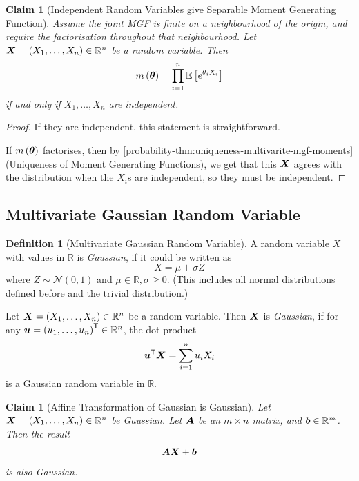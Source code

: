 \documentclass[11pt]{article}
\numberwithin{equation}{section}
\newtheorem{claim}[theorem]{Claim}
\theoremstyle{definition}
\newtheorem{definition}[theorem]{Definition}
\theoremstyle{remark}
\newcommand{\pqty}[1]{\left(#1\right)}
\newcommand{\bqty}[1]{\left[#1\right]}
\newcommand{\RR}{\mathbb R}
\newcommand{\transpose}{^{\mathsf T}}
\newcommand{\Expt}{\mathbb E}
\newcommand{\Normal}{\mathcal N}
\begin{document}
\begin{claim}[Independent Random Variables give Separable Moment Generating Function]\label{probability-claim-006}
    \label{probability-claim:independent-rv-separable-mgf}%
Assume the joint MGF is finite on a neighbourhood of the origin, and require the factorisation throughout that neighbourhood.
    Let \(\vb{X} = \pqty{X_1, \ldots, X_n} \in \RR^n\) be a random variable. Then
    \[
        m\pqty{\vb*{\theta}} = \prod_{i = 1}^{n} \Expt\bqty{e^{\theta_i X_i}}
    \]
    if and only if \(X_1, \ldots, X_n\) are independent.
\end{claim}

\begin{proof}\label{probability-proof-079}
    If they are independent, this statement is straightforward.

    If \(m\pqty{\vb*{\theta}}\) factorises, then by \autoref{probability-thm:uniqueness-multivarite-mgf-moments} (Uniqueness of Moment Generating Functions), we get that this \(\vb{X}\) agrees with the distribution when the \(X_i\)s are independent, so they must be independent.
\end{proof}

\subsection{Multivariate Gaussian Random Variable}

\begin{definition}[Multivariate Gaussian Random Variable]\label{probability-definition-066}
    \label{probability-def:multivariate-gaussian-rv}%
    A random variable \(X\) with values in \(\RR\) is \emph{Gaussian}, if it could be written as
    \[
        X = \mu + \sigma Z
    \]
    where \(Z \sim \Normal\pqty{0, 1}\) and \(\mu \in \RR, \sigma \geq 0\). (This includes all normal distributions defined before and the trivial distribution.)

    Let \(\vb{X} = \pqty{X_1, \ldots, X_n} \in \RR^n\) be a random variable. Then \(\vb{X}\) is \emph{Gaussian}, if for any \(\vb{u} = \pqty{u_1, \ldots, u_n}\transpose \in \RR^n\), the dot product
    \[
        \vb{u}\transpose \vb{X} = \sum_{i = 1}^{n} u_i X_i
    \]
    is a Gaussian random variable in \(\RR\).
\end{definition}

\begin{claim}[Affine Transformation of Gaussian is Gaussian]\label{probability-claim-007}
    \label{probability-claim:affine-transformation-preserves-gaussian}%
    Let \(\vb{X} = \pqty{X_1, \ldots, X_n} \in \RR^n\) be Gaussian. Let \(\vb{A}\) be an \(m \times n\) matrix, and \(\vb{b} \in \RR^m\). Then the result
    \[
        \vb{A} \vb{X} + \vb{b}
    \]
    is also Gaussian.
\end{claim}
\end{document}
